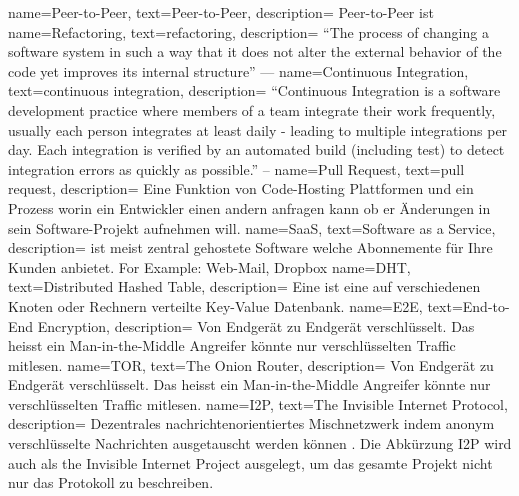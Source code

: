 \makeglossaries
                 { name={Peer-to-Peer},                  text={Peer-to-Peer},           description={{
    Peer-to-Peer ist
}}}
         { name={Refactoring},                   text={refactoring},            description={{
    ``The process of changing a software system in such a way that it does
        not alter the external behavior of the code yet improves its internal
        structure'' ---\cite{fowler_refactoring_2018}
}}}
                  { name={Continuous Integration},        text={continuous integration}, description={{
    ``Continuous Integration is a software development practice where members
    of a team integrate their work frequently,                                 usually each person integrates
    at least daily - leading to multiple integrations per day. Each integration
    is verified by an automated build (including test) to detect integration
    errors as quickly as possible.'' -- \cite{fowler_continuos_2014}
}}}
                  { name={Pull Request},                  text={pull request},           description={{
    Eine Funktion von Code-Hosting Plattformen und ein Prozess worin ein Entwickler einen andern anfragen kann ob er Änderungen in sein Software-Projekt aufnehmen will.
}}}
                { name={SaaS},                          text={Software as a Service},  description={{
             ist meist zentral gehostete Software welche Abonnemente für Ihre Kunden anbietet.
    For Example: Web-Mail, Dropbox
}}}
                 { name={DHT},        text={Distributed Hashed Table},                    description={{
    Eine  ist eine auf verschiedenen Knoten oder Rechnern verteilte Key-Value Datenbank.
}}}
                 { name={E2E},        text={End-to-End Encryption},                     description={{
    Von Endgerät zu Endgerät verschlüsselt. Das heisst ein Man-in-the-Middle Angreifer könnte nur verschlüsselten Traffic mitlesen.
}}}
                 { name={TOR},        text={The Onion Router},                          description={{
    Von Endgerät zu Endgerät verschlüsselt. Das heisst ein Man-in-the-Middle Angreifer könnte nur verschlüsselten Traffic mitlesen.
}}}
                 { name={I2P},        text={The Invisible Internet Protocol},                          description={{
            Dezentrales nachrichtenorientiertes Mischnetzwerk indem anonym verschlüsselte Nachrichten ausgetauscht werden können \parencite[p.~1]{zantout_i2p_2011}. Die Abkürzung I2P wird auch als the Invisible Internet Project ausgelegt, um das gesamte Projekt nicht nur das Protokoll zu beschreiben.
}}}
